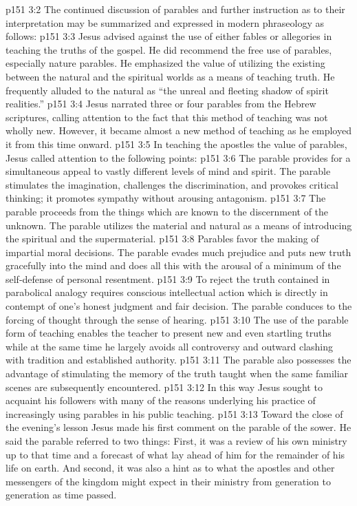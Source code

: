 \vs p151 3:2 \pc The continued discussion of parables and further instruction as to their interpretation may be summarized and expressed in modern phraseology as follows:
\vs p151 3:3 \bibnobreakspace Jesus advised against the use of either fables or allegories in teaching the truths of the gospel. He did recommend the free use of parables, especially nature parables. He emphasized the value of utilizing the  existing between the natural and the spiritual worlds as a means of teaching truth. He frequently alluded to the natural as “the unreal and fleeting shadow of spirit realities.”
\vs p151 3:4 \pc {}\bibnobreakspace Jesus narrated three or four parables from the Hebrew scriptures, calling attention to the fact that this method of teaching was not wholly new. However, it became almost a new method of teaching as he employed it from this time onward.
\vs p151 3:5 \pc {}\bibnobreakspace In teaching the apostles the value of parables, Jesus called attention to the following points:
\vs p151 3:6 The parable provides for a simultaneous appeal to vastly different levels of mind and spirit. The parable stimulates the imagination, challenges the discrimination, and provokes critical thinking; it promotes sympathy without arousing antagonism.
\vs p151 3:7 The parable proceeds from the things which are known to the discernment of the unknown. The parable utilizes the material and natural as a means of introducing the spiritual and the supermaterial.
\vs p151 3:8 Parables favor the making of impartial moral decisions. The parable evades much prejudice and puts new truth gracefully into the mind and does all this with the arousal of a minimum of the self\hyp{}defense of personal resentment.
\vs p151 3:9 To reject the truth contained in parabolical analogy requires conscious intellectual action which is directly in contempt of one’s honest judgment and fair decision. The parable conduces to the forcing of thought through the sense of hearing.
\vs p151 3:10 The use of the parable form of teaching enables the teacher to present new and even startling truths while at the same time he largely avoids all controversy and outward clashing with tradition and established authority.
\vs p151 3:11 The parable also possesses the advantage of stimulating the memory of the truth taught when the same familiar scenes are subsequently encountered.
\vs p151 3:12 \pc In this way Jesus sought to acquaint his followers with many of the reasons underlying his practice of increasingly using parables in his public teaching.
\vs p151 3:13 \pc Toward the close of the evening’s lesson Jesus made his first comment on the parable of the sower. He said the parable referred to two things: First, it was a review of his own ministry up to that time and a forecast of what lay ahead of him for the remainder of his life on earth. And second, it was also a hint as to what the apostles and other messengers of the kingdom might expect in their ministry from generation to generation as time passed.
